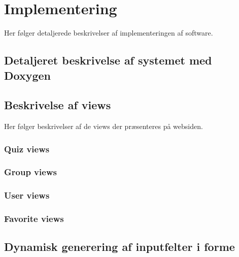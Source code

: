 \chapter{Implementering}

Her følger detaljerede beskrivelser af implementeringen af software.

\section{Detaljeret beskrivelse af systemet med Doxygen}


\section{Beskrivelse af views}\label{sec:views}
Her følger beskrivelser af de views der præsenteres på websiden.
\subsection{Quiz views}




\subsection{Group views}




\subsection{User views}


\subsection{Favorite views}



\section{Dynamisk generering af inputfelter i forme}


